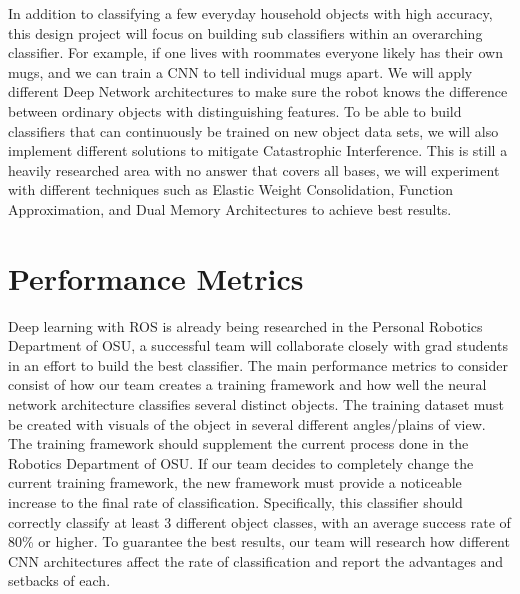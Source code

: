 \documentclass[a4paper]{article}
\begin{document}
In addition to classifying a few everyday household objects with high accuracy, this design project will focus on building sub classifiers within an overarching classifier. For example, if one lives with roommates everyone likely has their own mugs, and we can train a CNN to tell individual mugs apart. We will apply different Deep Network architectures to make sure the robot knows the difference between ordinary objects with distinguishing features. To be able to build classifiers that can continuously be trained on new object data sets, we will also implement different solutions to mitigate Catastrophic Interference. This is still a heavily researched area with no answer that covers all bases, we will experiment with different techniques such as Elastic Weight Consolidation, Function Approximation, and Dual Memory Architectures to achieve best results.

\section{Performance Metrics}
Deep learning with ROS is already being researched in the Personal Robotics Department of OSU, a successful team will collaborate closely with grad students in an effort to build the best classifier. The main performance metrics to consider consist of how our team creates a training framework and how well the neural network architecture classifies several distinct objects. The training dataset must be created with visuals of the object in several different angles/plains of view. The training framework should supplement the current process done in the Robotics Department of OSU. If our team decides to completely change the current training framework, the new framework must provide a noticeable increase to the final rate of classification. Specifically, this classifier should correctly classify at least 3 different object classes, with an average success rate of 80\% or higher. To guarantee the best results, our team will research how different CNN architectures affect the rate of classification and report the advantages and setbacks of each.
\end{document}
